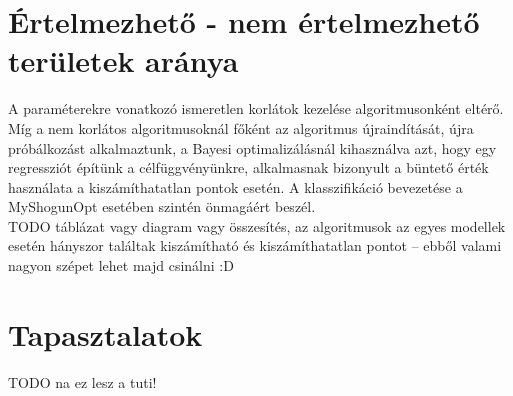 \section{Értelmezhető - nem értelmezhető területek aránya}
A paraméterekre vonatkozó ismeretlen korlátok kezelése algoritmusonként eltérő. Míg a nem korlátos algoritmusoknál főként az algoritmus újraindítását, újra próbálkozást alkalmaztunk, a Bayesi optimalizálásnál kihasználva azt, hogy egy regressziót építünk a célfüggvényünkre, alkalmasnak bizonyult a büntető érték használata a kiszámíthatatlan pontok esetén. A klasszifikáció bevezetése a MyShogunOpt esetében szintén önmagáért beszél.\\
{\Huge TODO táblázat vagy diagram vagy összesítés, az algoritmusok az egyes modellek esetén hányszor találtak kiszámítható és kiszámíthatatlan pontot -- ebből valami nagyon szépet lehet majd csinálni :D}
\section{Tapasztalatok}
{\Huge TODO na ez lesz a tuti!}